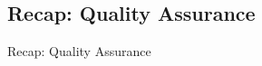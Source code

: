 \subsection{Recap: Quality Assurance}
\begin{frame}{Recap: Quality Assurance \mytitlesource{\ludewiglichter}}
	\vspace{-8mm}
	\hfill
\end{frame}

